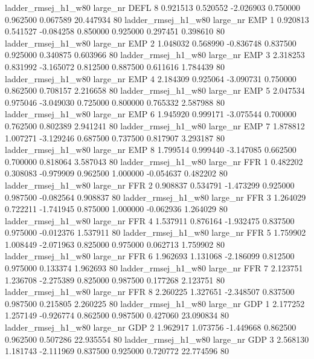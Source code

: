 ladder_rmsej_h1_w80   large_nr     DEFL                 8  0.921513  0.520552  -2.026903 0.750000 0.962500  0.067589   20.447934 80
ladder_rmsej_h1_w80   large_nr      EMP                 1  0.920813  0.541527  -0.084258 0.850000 0.925000  0.297451    0.398610 80
ladder_rmsej_h1_w80   large_nr      EMP                 2  1.048032  0.568990  -0.836748 0.837500 0.925000  0.340875    0.603966 80
ladder_rmsej_h1_w80   large_nr      EMP                 3  2.318253  0.831992  -3.165072 0.812500 0.887500  0.611616    1.784439 80
ladder_rmsej_h1_w80   large_nr      EMP                 4  2.184309  0.925064  -3.090731 0.750000 0.862500  0.708157    2.216658 80
ladder_rmsej_h1_w80   large_nr      EMP                 5  2.047534  0.975046  -3.049030 0.725000 0.800000  0.765332    2.587988 80
ladder_rmsej_h1_w80   large_nr      EMP                 6  1.945920  0.999171  -3.075544 0.700000 0.762500  0.802389    2.941241 80
ladder_rmsej_h1_w80   large_nr      EMP                 7  1.878812  1.007271  -3.129246 0.687500 0.737500  0.817907    3.293187 80
ladder_rmsej_h1_w80   large_nr      EMP                 8  1.799514  0.999440  -3.147085 0.662500 0.700000  0.818064    3.587043 80
ladder_rmsej_h1_w80   large_nr      FFR                 1  0.482202  0.308083  -0.979909 0.962500 1.000000 -0.054637    0.482202 80
ladder_rmsej_h1_w80   large_nr      FFR                 2  0.908837  0.534791  -1.473299 0.925000 0.987500 -0.082564    0.908837 80
ladder_rmsej_h1_w80   large_nr      FFR                 3  1.264029  0.722211  -1.741945 0.875000 1.000000 -0.062936    1.264029 80
ladder_rmsej_h1_w80   large_nr      FFR                 4  1.537911  0.876164  -1.932475 0.837500 0.975000 -0.012376    1.537911 80
ladder_rmsej_h1_w80   large_nr      FFR                 5  1.759902  1.008449  -2.071963 0.825000 0.975000  0.062713    1.759902 80
ladder_rmsej_h1_w80   large_nr      FFR                 6  1.962693  1.131068  -2.186099 0.812500 0.975000  0.133374    1.962693 80
ladder_rmsej_h1_w80   large_nr      FFR                 7  2.123751  1.236708  -2.275389 0.825000 0.987500  0.177268    2.123751 80
ladder_rmsej_h1_w80   large_nr      FFR                 8  2.260225  1.327651  -2.348507 0.837500 0.987500  0.215805    2.260225 80
ladder_rmsej_h1_w80   large_nr      GDP                 1  2.177252  1.257149  -0.926774 0.862500 0.987500  0.427060   23.090834 80
ladder_rmsej_h1_w80   large_nr      GDP                 2  1.962917  1.073756  -1.449668 0.862500 0.962500  0.507286   22.935554 80
ladder_rmsej_h1_w80   large_nr      GDP                 3  2.568130  1.181743  -2.111969 0.837500 0.925000  0.720772   22.774596 80
